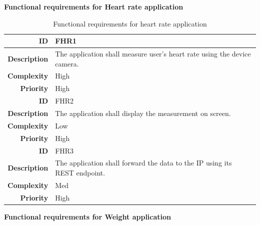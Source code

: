 \newpage
\textbf{Functional requirements for Heart rate application}

\begin{table}[H]
\begin{center}
\begin{tabular}{ | r | p{11.5cm} | }
  \hline

  \textbf{ID} & FHR1 \\
  \hline\noalign{\smallskip}\hline
  \textbf{Description}  & The application shall measure user's heart rate using the device camera.\\
  \textbf{Complexity}   & High \\
  \textbf{Priority}     & High \\
  \hline\noalign{\smallskip}\noalign{\smallskip}\hline

  \textbf{ID} & FHR2 \\
  \hline\noalign{\smallskip}\hline
  \textbf{Description}  & The application shall display the measurement on screen. \\
  \textbf{Complexity}   & Low \\
  \textbf{Priority}     & High \\
  \hline\noalign{\smallskip}\noalign{\smallskip}\hline

  \textbf{ID} & FHR3 \\
  \hline\noalign{\smallskip}\hline
  \textbf{Description}  & The application shall forward the data to the IP using its REST endpoint.\\
  \textbf{Complexity}   & Med \\
  \textbf{Priority}     & High \\
  
  \hline
\end{tabular}
\end{center}
\caption{Functional requirements for heart rate application}
\label{table:reqheartrate}
\end{table}


\newpage
\textbf{Functional requirements for Weight application}

